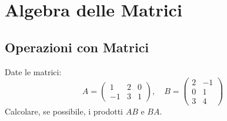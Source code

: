 \section{Algebra delle Matrici}

\subsection{Operazioni con Matrici}

\begin{exercisebox}[title={Esercizio 1: Prodotto Righe per Colonne}]
Date le matrici:
$$ A = \begin{pmatrix} 1 & 2 & 0 \\ -1 & 3 & 1 \end{pmatrix}, \quad B = \begin{pmatrix} 2 & -1 \\ 0 & 1 \\ 3 & 4 \end{pmatrix} $$
Calcolare, se possibile, i prodotti $AB$ e $BA$.
\end{exercisebox}

